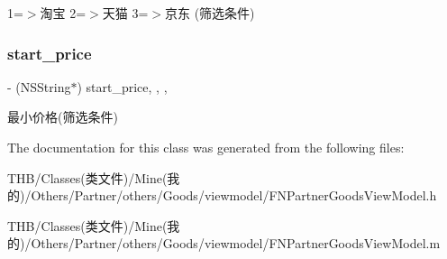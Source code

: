 1=$>$淘宝 2=$>$天猫 3=$>$京东 (筛选条件) \mbox{\label{interface_f_n_partner_goods_view_model_a4c03042908d4931615fb14851f5f3c80}} 
\subsubsection{\texorpdfstring{start\+\_\+price}{start\_price}}
{\footnotesize\ttfamily -\/ (N\+S\+String$\ast$) start\+\_\+price\hspace{0.3cm}{\ttfamily [read]}, {\ttfamily [write]}, {\ttfamily [nonatomic]}, {\ttfamily [copy]}}

最小价格(筛选条件) 

The documentation for this class was generated from the following files\+:\begin{DoxyCompactItemize}
\item 
T\+H\+B/\+Classes(类文件)/\+Mine(我的)/\+Others/\+Partner/others/\+Goods/viewmodel/F\+N\+Partner\+Goods\+View\+Model.\+h\item 
T\+H\+B/\+Classes(类文件)/\+Mine(我的)/\+Others/\+Partner/others/\+Goods/viewmodel/F\+N\+Partner\+Goods\+View\+Model.\+m\end{DoxyCompactItemize}
